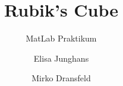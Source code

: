\documentclass[a4paper,12pt]{scrartcl}
\title{Rubik's Cube}
\subtitle{MatLab Praktikum}
\author{Elisa Junghans\and Mirko Dransfeld}
\date{}
\newcommand{\mcode}[3]{
  
}
\begin{document}
  \maketitle
  \mcode{84}{104}{RubiksCube}
\end{document}
